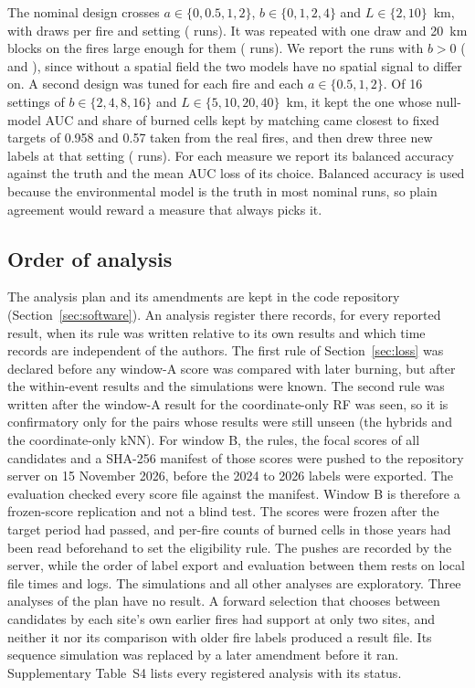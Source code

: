 \documentclass[preprint,12pt,authoryear]{elsarticle}
\begin{document}
The nominal design crosses $a \in \{0, 0.5, 1, 2\}$, $b \in \{0, 1, 2, 4\}$ and $L \in \{2, 10\}$~km, with \sSimTenDraws{} draws per fire and setting (\sSimTenAllRuns{} runs). It was repeated with one draw and 20~km blocks on the \sSimFortyFires{} fires large enough for them (\sSimFortyAllRuns{} runs). We report the runs with $b > 0$ (\sSimTenRuns{} and \sSimFortyRuns), since without a spatial field the two models have no spatial signal to differ on. A second design was tuned for each fire and each $a \in \{0.5, 1, 2\}$. Of 16 settings of $b \in \{2, 4, 8, 16\}$ and $L \in \{5, 10, 20, 40\}$~km, it kept the one whose null-model AUC and share of burned cells kept by matching came closest to fixed targets of 0.958 and 0.57 taken from the real fires, and then drew three new labels at that setting (\sSimCalRuns{} runs). For each measure we report its balanced accuracy against the truth and the mean AUC loss of its choice. Balanced accuracy is used because the environmental model is the truth in most nominal runs, so plain agreement would reward a measure that always picks it.

\subsection{Order of analysis}
\label{sec:order}

The analysis plan and its amendments are kept in the code repository (Section~\ref{sec:software}). An analysis register there records, for every reported result, when its rule was written relative to its own results and which time records are independent of the authors. The first rule of Section~\ref{sec:loss} was declared before any window-A score was compared with later burning, but after the within-event results and the simulations were known. The second rule was written after the window-A result for the coordinate-only RF was seen, so it is confirmatory only for the pairs whose results were still unseen (the hybrids and the coordinate-only kNN). For window B, the rules, the focal scores of all candidates and a SHA-256 manifest of those scores were pushed to the repository server on 15 November 2026, before the 2024 to 2026 labels were exported. The evaluation checked every score file against the manifest. Window B is therefore a frozen-score replication and not a blind test. The scores were frozen after the target period had passed, and per-fire counts of burned cells in those years had been read beforehand to set the eligibility rule. The pushes are recorded by the server, while the order of label export and evaluation between them rests on local file times and logs. The simulations and all other analyses are exploratory. Three analyses of the plan have no result. A forward selection that chooses between candidates by each site's own earlier fires had support at only two sites, and neither it nor its comparison with older fire labels produced a result file. Its sequence simulation was replaced by a later amendment before it ran. Supplementary Table~S4 lists every registered analysis with its status.
\end{document}
